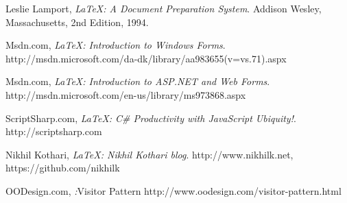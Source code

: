 \begin{thebibliography}{9}
  Leslie Lamport,
  \emph{\LaTeX: A Document Preparation System}.
  Addison Wesley, Massachusetts,
  2nd Edition,
  1994.


  Msdn.com,
  \emph{\LaTeX: Introduction to Windows Forms}.
  http://msdn.microsoft.com/da-dk/library/aa983655(v=vs.71).aspx

  Msdn.com,
  \emph{\LaTeX: Introduction to ASP.NET and Web Forms}.
  http://msdn.microsoft.com/en-us/library/ms973868.aspx

  ScriptSharp.com,
  \emph{\LaTeX: C\# Productivity with JavaScript Ubiquity!}.
  http://scriptsharp.com

  Nikhil Kothari,
  \emph{\LaTeX: Nikhil Kothari blog}.
  http://www.nikhilk.net, https://github.com/nikhilk
  
  OODesign.com,
  \emph:{Visitor Pattern}
  http://www.oodesign.com/visitor-pattern.html
\end{thebibliography}










